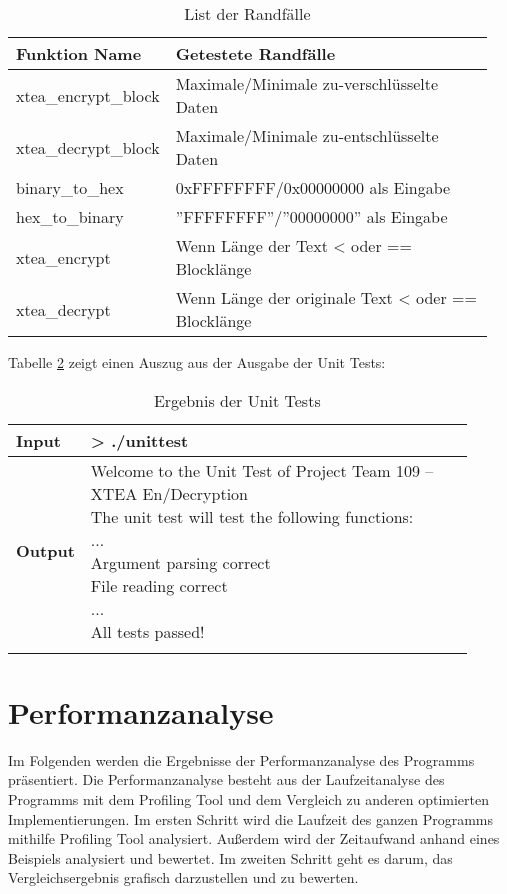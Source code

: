 \documentclass[course=erap]{aspdoc}
\begin{document}
\begin{table}[h]
    \centering
    \footnotesize 
    \begin{tabular}{p{0.2\linewidth}p{0.75\linewidth}}
    \toprule[2pt]
         Funktion Name & Getestete Randfälle\\
        \midrule
         xtea\_encrypt\_block & Maximale/Minimale zu-verschlüsselte Daten\\
         xtea\_decrypt\_block & Maximale/Minimale zu-entschlüsselte Daten\\
         binary\_to\_hex & 0xFFFFFFFF/0x00000000 als Eingabe \\
         hex\_to\_binary & ''FFFFFFFF''/''00000000'' als Eingabe\\
         xtea\_encrypt & Wenn Länge der Text < oder == Blocklänge\\
         xtea\_decrypt & Wenn Länge der originale Text < oder == Blocklänge\\
    \bottomrule[2pt]
    \end{tabular}
    \caption{List der Randfälle}
    \label{tab:ut_edgecase}
\end{table}

Tabelle \ref{tab:ut_res} zeigt einen Auszug aus der Ausgabe der Unit Tests:

{\centering
\footnotesize    
\begin{longtable}[h]{p{0.06\linewidth}p{0.85\linewidth}}
    
    \toprule[2pt]
    \textbf{Input}  &  > ./unittest  \\
    \midrule
    
    \textbf{Output}   &  \makecell[l]{
    Welcome to the Unit Test of Project Team 109 -- XTEA En/Decryption\\
    The unit test will test the following functions:\\
    ...\\
    Argument parsing correct\\
    File reading correct\\
    ...\\
    All tests passed!} \\

    \bottomrule[2pt] 
    \caption{Ergebnis der Unit Tests}
    \label{tab:ut_res}\\
\end{longtable}}



\section{Performanzanalyse}
Im Folgenden werden die Ergebnisse der Performanzanalyse des Programms präsentiert. Die Performanzanalyse besteht aus der Laufzeitanalyse des Programms mit dem Profiling Tool und dem Vergleich zu anderen optimierten Implementierungen. \vspace{80mm}
Im ersten Schritt wird die Laufzeit des ganzen Programms mithilfe Profiling Tool analysiert. Außerdem wird der Zeitaufwand anhand eines Beispiels analysiert und bewertet. Im zweiten Schritt geht es darum, das Vergleichsergebnis grafisch darzustellen und zu bewerten.
\end{document}
